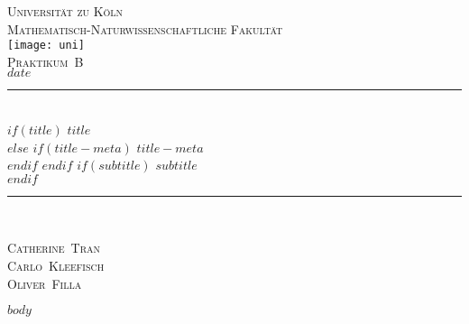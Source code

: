\documentclass[12pt,a4paper]{scrartcl}
\numberwithin{equation}{section} %
\newcommand{\HRule}{\rule{\linewidth}{0.7mm}}
\begin{document}
\begin{titlepage}
	\pagestyle{empty}

	\begin{center}

	\textsc{\LARGE Universität zu Köln }\\ [0.4cm]
	\textsc{Mathematisch-Naturwissenschaftliche Fakultät} \\[1.5cm]

	\texttt{[image: uni]}\\[1.5cm]  %

	\textsc{\Large Praktikum~B}\\[2mm]
	\textsc{$date$}\\[10mm]
	\HRule \\[0.4cm]

	$if(title)$
	{	\Huge \bfseries $title$}\\[0.4cm]
	$else$
	$if(title-meta)$
	{	\Huge \bfseries $title-meta$}\\[0.4cm]
	$endif$
	$endif$
	$if(subtitle)$
	{	\huge \bfseries $subtitle$}\\[0.3cm]
	$endif$

	\HRule \\[3cm]

 	\begin{center}
		\textsc{\Large Catherine~Tran } \\[3pt]
		\textsc{\Large Carlo~Kleefisch } \\[3pt]
		\textsc{\Large Oliver~Filla } \\[3pt]
	\end{center}
	\end{center}
\end{titlepage}

\newpage
\tableofcontents
\newpage

$body$
\end{document}
